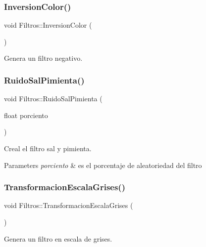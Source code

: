 \subsubsection{\texorpdfstring{Inversion\+Color()}{InversionColor()}}
{\footnotesize\ttfamily void Filtros\+::\+Inversion\+Color (\begin{DoxyParamCaption}{ }\end{DoxyParamCaption})}



Genera un filtro negativo. 

\mbox{\label{class_filtros_a2ad4f5b18c537599bc171b9799683b1a}} 
\subsubsection{\texorpdfstring{Ruido\+Sal\+Pimienta()}{RuidoSalPimienta()}}
{\footnotesize\ttfamily void Filtros\+::\+Ruido\+Sal\+Pimienta (\begin{DoxyParamCaption}\item[{float}]{porciento }\end{DoxyParamCaption})}



Creal el filtro sal y pimienta. 


\begin{DoxyParams}{Parameters}
{\em porciento} & es el porcentaje de aleatoriedad del filtro \\
\hline
\end{DoxyParams}
\mbox{\label{class_filtros_a19ec703cb72322ef5cb7a38aa7de5c7b}} 
\subsubsection{\texorpdfstring{Transformacion\+Escala\+Grises()}{TransformacionEscalaGrises()}}
{\footnotesize\ttfamily void Filtros\+::\+Transformacion\+Escala\+Grises (\begin{DoxyParamCaption}{ }\end{DoxyParamCaption})}



Genera un filtro en escala de grises. 



